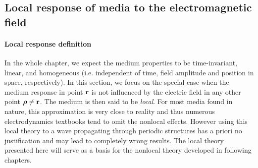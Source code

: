 \subsection{Local response of media to the electromagnetic field} \label{loc_response_of_media}
\paragraph{Local response definition} \label{subsection_local_resp} %
In the whole chapter, we expect the medium properties to be time-invariant, linear, and homogeneous (i.e. independent of time, field amplitude and position in space, respectively). 
In this section, we focus on the special case when the medium response in point ${\mathbf{r}}$ is not influenced by the electric field in any other point $\boldsymbol{\rho} \neq {\mathbf{r}}$. The medium is then said to be \textit{local}. 
For most media found in nature, this approximation is very close to reality and thus numerous electrodynamics textbooks tend to omit the nonlocal effects. 
However using this local theory to a wave propagating through periodic structures has a priori no justification and may lead to completely wrong results. The local theory presented here will serve as a basis for the nonlocal theory developed in following chapters.

